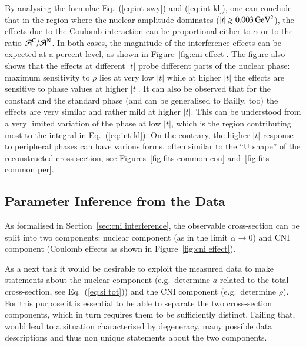By analysing the formulae Eq.~(\ref{eq:int swy}) and (\ref{eq:int kl}), one can conclude that in the region where the nuclear amplitude dominates ($|t| \gtrsim 0.003\,{\rm GeV^2}$), the effects due to the Coulomb interaction can be proportional either to $\alpha$ or to the ratio ${\cal A}^{\rm C} / {\cal A}^{\rm N}$. In both cases, the magnitude of the interference effects can be expected at a percent level, as shown in Figure~\ref{fig:cni effect}. The figure also shows that the effects at different $|t|$ probe different parts of the nuclear phase: maximum sensitivity to $\rho$ lies at very low $|t|$ while at higher $|t|$ the effects are sensitive to phase values at higher $|t|$. It can also be observed that for the constant and the standard phase (and can be generalised to Bailly, too) the effects are very similar and rather mild at higher $|t|$. This can be understood from a very limited variation of the phase at low $|t|$, which is the region contributing most to the integral in Eq.~(\ref{eq:int kl}). On the contrary, the higher $|t|$ response to peripheral phases can have various forms, often similar to the ``U shape'' of the reconstructed cross-section, see Figures~\ref{fig:fits common con} and~\ref{fig:fits common per}.




\subsection{Parameter Inference from the Data}
\label{sec:cni task discussion}

As formalised in Section~\ref{sec:cni interference}, the observable cross-section can be split into two components: nuclear component (as in the limit $\alpha\to 0$) and CNI component (Coulomb effects as shown in Figure~\ref{fig:cni effect}).

As a next task it would be desirable to exploit the measured data to make statements about the nuclear component (e.g.~determine $a$ related to the total cross-section, see Eq.~(\ref{eq:si tot})) and the CNI component (e.g.~determine $\rho$). For this purpose it is essential to be able to separate the two cross-section components, which in turn requires them to be sufficiently distinct. Failing that, would lead to a situation characterised by degeneracy, many possible data descriptions and thus non unique statements about the two components.

